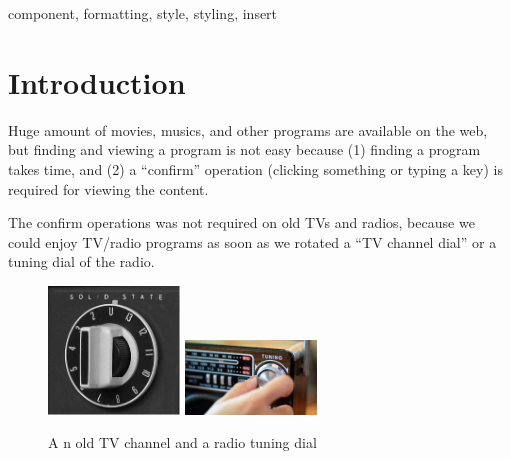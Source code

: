 \documentclass[conference]{IEEEtran}
\begin{document}
\begin{IEEEkeywords}
component, formatting, style, styling, insert
\end{IEEEkeywords}

\section{Introduction}

% 

Huge amount of movies, musics, and other programs are available on the web, but
finding and viewing a program is not easy because
(1) finding a program takes time, and
(2) a ``confirm'' operation (clicking something or typing a key)
is required for viewing the content.


The confirm operations was not required on old TVs and radios,
because we could enjoy TV/radio programs
as soon as we rotated a ``TV channel dial'' or a tuning dial of the radio.

\begin{figure}[H]
\centerline{
   \includegraphics[width=35mm,bb=0 0 279 272]{figures/9bd96506bdaac48b26c5cd192851c11d.png}
   \includegraphics[width=35mm,bb=0 0 128 72]{figures/fedc4f3c899c48b5a3ddd0982801c79d.png}
}
\caption{A n old TV channel and a radio tuning dial}
\label{TV channel}
\end{figure}


\end{document}
